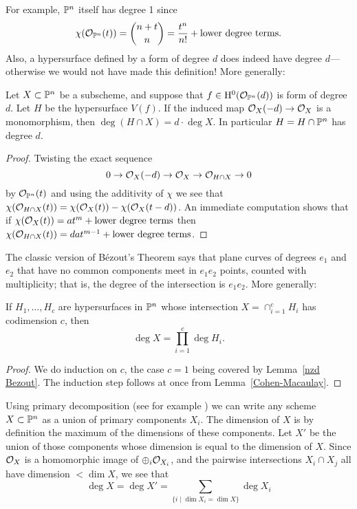 {For example, $\PP^{n}$ itself has degree 1 since 
$$
\chi(\cO_{\PP^{n}}(t)) = {n+t\choose n} = \frac{t^{n}}{n!} +\hbox{lower degree terms}.
$$
Also, a hypersurface defined by a form of degree $d$ does indeed have degree $d$---otherwise we would not have made
this definition! More generally:

\begin{lemma}\label{nzd Bezout}
Let $X\subset \PP^{n}$ be a subscheme, and suppose that $f \in \HH^{0}(\cO_{\PP^{n}}(d))$ is form of degree $d$. Let $H$ be the hypersurface $V(f)$.  If
the induced map $\cO_{X}(-d) \to \cO_{X}$ is a monomorphism, then 
$\deg (H \cap X) = d\cdot\deg X$. In particular $H = H\cap \PP^{n}$ has degree $d$.
\end{lemma}
\begin{proof}
Twisting the exact sequence 
 $$
 0\to \cO_{X}(-d) \to \cO_{X} \to \cO_{H\cap X} \to 0
 $$
 by $\cO_{\PP^{n}}(t)$ and using the additivity of $\chi$ we see that
$\chi(\cO_{H\cap X}(t)) = \chi(\cO_{X}(t)) - \chi(\cO_{X}(t-d))$. An immediate computation shows that if 
$\chi(\cO_{X}(t)) = at^{m} +\hbox{lower degree terms}$ then 
$\chi(\cO_{H\cap X}(t)) = dat^{m-1} +\hbox{lower degree terms}$.
\end{proof}

The classic version of B\'ezout's Theorem says that plane curves of degrees $e_{1}$ and $e_{2}$ that
have no common components meet in $e_{1}e_{2}$ points, counted with multiplicity; that is, the degree of the 
intersection is $e_{1}e_{2}$.
More generally:

\begin{corollary}\label{classic Bezout}
 If $H_{1}, \dots, H_{c}$ are hypersurfaces in $\PP^{n}$ whose intersection
 $X = \cap_{i=1}^{c}H_{i}$ has codimension $c$, then 
 $$
 \deg X = \prod_{i=1}^{c}\deg H_{i}.
 $$
\end{corollary}
\begin{proof}
We do induction on $c$, the case $c=1$ being covered by Lemma~\ref{nzd Bezout}. The induction step
follows at once from Lemma~\ref{Cohen-Macaulay}.
\end{proof}


Using primary decomposition (see for example \cite[Section II.3.3]{GeomSchemes}) we can write any
scheme $X\subset \PP^{n}$ as a union of primary components $X_{i}$. The dimension of $X$ is
by definition the maximum of the dimensions of these components. Let $X'$ be the union of those
components whose dimension is equal to the dimension of $X$. Since $\cO_{X}$ is a homomorphic image of
$\oplus_{i}\cO_{X_{i}}$, and the pairwise intersections $X_{i}\cap X_{j}$ all have dimension $<\dim X$, 
we see that 
$$
\deg X = \deg X' = \sum_{\{i\mid \dim X_{i} = \dim X\}}\deg X_{i}
$$

}

